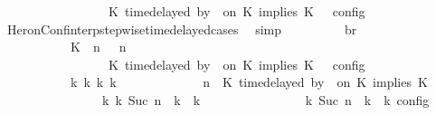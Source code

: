 \begin{isabellebody}
\ \ \ \ \ \ \ \ \ \ \ \ \ \ {\isasymturnstile}\ {\isasymPsi}\ {\isasymtriangleright}\ {\isacharparenleft}{\isacharparenleft}K\ time{\isacharminus}delayed\ by\ {\isasymdelta}{\isasymtau}\ on\ K\ implies\ K\ {\isacharhash}\ {\isasymPhi}{\isacharparenright}\ {\isasymrbrakk}\isactrlsub c\isactrlsub o\isactrlsub n\isactrlsub f\isactrlsub i\isactrlsub g{\isacartoucheclose}\isanewline
\ \ \ \ \ \ \ \ \isamarkupfalse%
\ HeronConf{\isacharunderscore}interp{\isacharunderscore}stepwise{\isacharunderscore}timedelayed{\isacharunderscore}cases\ \isamarkupfalse%
\ simp\isanewline
\ \ \ \ \ \ \isamarkupfalse%
\ \isamarkupfalse%
\ br{}{\isacharcolon}\isanewline
\ \ \ \ \ \ \ \ {\isacartoucheopen}{\isasymrho}\ {\isasymin}\ {\isasymlbrakk}\ {\isacharparenleft}{\isacharparenleft}K\ {\isasymnot}{\isasymUp}\ n{\isacharparenright}\ {\isacharhash}\ {\isasymGamma}{\isacharparenright}{\isacharcomma}\ n\isanewline
\ \ \ \ \ \ \ \ \ \ \ \ \ \ {\isasymturnstile}\ {\isasymPsi}\ {\isasymtriangleright}\ {\isacharparenleft}{\isacharparenleft}K\ time{\isacharminus}delayed\ by\ {\isasymdelta}{\isasymtau}\ on\ K\ implies\ K\ {\isacharhash}\ {\isasymPhi}{\isacharparenright}\ {\isasymrbrakk}\isactrlsub c\isactrlsub o\isactrlsub n\isactrlsub f\isactrlsub i\isactrlsub g\isanewline
\ \ \ \ \ \ \ \ \ \ {\isasymLongrightarrow}\ {\isasymexists}{\isasymGamma}\isactrlsub k\ {\isasymPsi}\isactrlsub k\ {\isasymPhi}\isactrlsub k\ k{\isachardot}\isanewline
\ \ \ \ \ \ \ \ \ \ \ \ {\isacharparenleft}{\isacharparenleft}{\isasymGamma}{\isacharcomma}\ n\ {\isasymturnstile}\ {\isacharparenleft}{\isacharparenleft}K\ time{\isacharminus}delayed\ by\ {\isasymdelta}{\isasymtau}\ on\ K\ implies\ K\ {\isacharhash}\ {\isasymPsi}{\isacharparenright}\ {\isasymtriangleright}\ {\isasymPhi}{\isacharparenright}\isanewline
\ \ \ \ \ \ \ \ \ \ \ \ \ \ \ \ {\isasymhookrightarrow}\isactrlbsup k\isactrlesup \ {\isacharparenleft}{\isasymGamma}\isactrlsub k{\isacharcomma}\ Suc\ n\ {\isasymturnstile}\ {\isasymPsi}\isactrlsub k\ {\isasymtriangleright}\ {\isasymPhi}\isactrlsub k{\isacharparenright}{\isacharparenright}\isanewline
\ \ \ \ \ \ \ \ \ \ \ \ {\isasymand}\ {\isasymrho}\ {\isasymin}\ {\isasymlbrakk}\ {\isasymGamma}\isactrlsub k{\isacharcomma}\ Suc\ n\ {\isasymturnstile}\ {\isasymPsi}\isactrlsub k\ {\isasymtriangleright}\ {\isasymPhi}\isactrlsub k\ {\isasymrbrakk}\isactrlsub c\isactrlsub o\isactrlsub n\isactrlsub f\isactrlsub i\isactrlsub g{\isacartoucheclose}\isanewline

\end{isabellebody}

